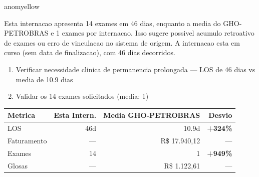 \documentclass[a4paper,10pt]{article}
\begin{document}
\begin{anomalycard}[Internacao 164491 | GHO-PETROBRAS | MODERADO (z=2.49)]{anomyellow}
\vspace{2pt}\begin{tcolorbox}[colback=severityred!20,colframe=anomyellow,title={\textbf{Interpretacao de Negocio}},fonttitle=\bfseries\small,left=4pt,right=4pt,top=3pt,bottom=3pt]
{\small Esta internacao apresenta 14 exames em 46 dias, enquanto a media do GHO-PETROBRAS e 1 exames por internacao. Isso sugere possivel acumulo retroativo de exames ou erro de vinculacao no sistema de origem. A internacao esta em curso (sem data de finalizacao), com 46 dias decorridos.}
\end{tcolorbox}
\begin{tcolorbox}[colback=severityyellow!30,colframe=anomorange,title={\textbf{Recomendacoes Especificas}},fonttitle=\bfseries\small,left=4pt,right=4pt,top=3pt,bottom=3pt]
\begin{enumerate}[nosep,leftmargin=16pt]
\item {\small Verificar necessidade clinica de permanencia prolongada --- LOS de 46 dias vs media de 10.9 dias}
\item {\small Validar os 14 exames solicitados (media: 1)}
\end{enumerate}
\end{tcolorbox}
\begin{center}\begin{tabular}{l r r r}\toprule\textbf{Metrica} & \textbf{Esta Intern.} & \textbf{Media GHO-PETROBRAS} & \textbf{Desvio} \\\midrule
LOS & 46d & 10.9d & \textcolor{anomred}{\textbf{+324\%}} \\
Faturamento & --- & R\$ 17.940,12 & --- \\
Exames & 14 & 1 & \textcolor{anomred}{\textbf{+949\%}} \\
Glosas & --- & R\$ 1.122,61 & --- \\
\bottomrule\end{tabular}\end{center}


\end{anomalycard}
\end{document}

